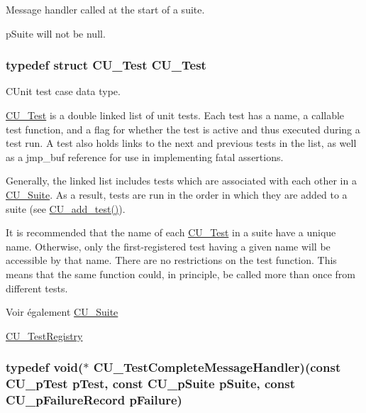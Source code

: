 Message handler called at the start of a suite. 

p\-Suite will not be null. \hypertarget{group__Framework_ga0bc6468b9781a574e2c7994ca700ee1e}{
\subsubsection[{C\-U\-\_\-\-Test}]{\setlength{\rightskip}{0pt plus 5cm}typedef struct {\bf C\-U\-\_\-\-Test}  {\bf C\-U\-\_\-\-Test}}}\label{group__Framework_ga0bc6468b9781a574e2c7994ca700ee1e}


C\-Unit test case data type. 

\hyperlink{structCU__Test}{C\-U\-\_\-\-Test} is a double linked list of unit tests. Each test has a name, a callable test function, and a flag for whether the test is active and thus executed during a test run. A test also holds links to the next and previous tests in the list, as well as a jmp\-\_\-buf reference for use in implementing fatal assertions.\par
\par


Generally, the linked list includes tests which are associated with each other in a \hyperlink{structCU__Suite}{C\-U\-\_\-\-Suite}. As a result, tests are run in the order in which they are added to a suite (see \hyperlink{group__Framework_gad9f198a8a5fa8cc6870c3c8be873869f}{C\-U\-\_\-add\-\_\-test()}). \par
\par


It is recommended that the name of each \hyperlink{structCU__Test}{C\-U\-\_\-\-Test} in a suite have a unique name. Otherwise, only the first-\/registered test having a given name will be accessible by that name. There are no restrictions on the test function. This means that the same function could, in principle, be called more than once from different tests.

\begin{DoxySeeAlso}{Voir également}
\hyperlink{structCU__Suite}{C\-U\-\_\-\-Suite} 

\hyperlink{structCU__TestRegistry}{C\-U\-\_\-\-Test\-Registry} 
\end{DoxySeeAlso}
\hypertarget{group__Framework_ga2c11da75531b097ca037223489bf02be}{
\subsubsection[{C\-U\-\_\-\-Test\-Complete\-Message\-Handler}]{\setlength{\rightskip}{0pt plus 5cm}typedef void($\ast$ C\-U\-\_\-\-Test\-Complete\-Message\-Handler)(const {\bf C\-U\-\_\-p\-Test} p\-Test, const {\bf C\-U\-\_\-p\-Suite} p\-Suite, const {\bf C\-U\-\_\-p\-Failure\-Record} p\-Failure)}}\label{group__Framework_ga2c11da75531b097ca037223489bf02be}


